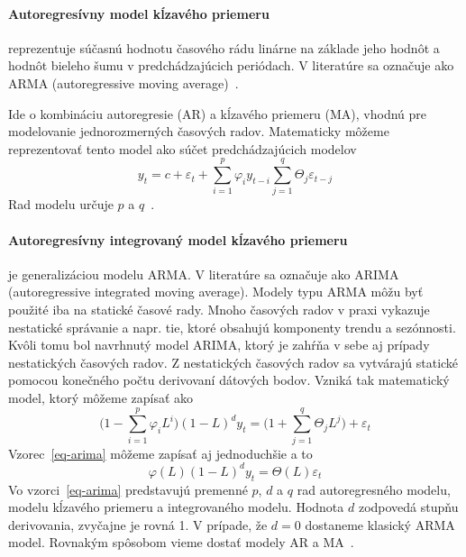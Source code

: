 \documentclass[a4paper,slovak,12pt,appendix]{article}
\begin{document}
\paragraph{Autoregresívny model kĺzavého priemeru} reprezentuje súčasnú hodnotu
časového rádu linárne na základe jeho hodnôt a hodnôt bieleho šumu
v predchádzajúcich periódach. V literatúre sa označuje ako ARMA (autoregressive
moving average)~\cite{KumarSingh2013}.

Ide o kombináciu autoregresie (AR) a kĺzavého priemeru (MA), vhodnú pre
modelovanie jednorozmerných časových radov. Matematicky môžeme reprezentovať
tento model ako súčet predchádzajúcich modelov
\begin{equation}
  y_t = c + \varepsilon_t + \sum_{i=1}^{p} \varphi_i y_{t-i}  \sum_{j=1}^{q} \Theta_j \varepsilon_{t-j}
  \label{eq-arma}
\end{equation}
Rad modelu určuje $p$ a $q$~\cite{Agrawal2013}.

\paragraph{Autoregresívny integrovaný model kĺzavého priemeru} je
generalizáciou modelu ARMA. V literatúre sa označuje ako ARIMA (autoregressive
integrated moving average). Modely typu ARMA môžu byť použité iba na statické
časové rady. Mnoho časových radov v praxi vykazuje nestatické správanie a napr.
tie, ktoré obsahujú komponenty trendu a sezónnosti. Kvôli tomu bol navrhnutý
model ARIMA, ktorý je zahŕňa v sebe aj prípady nestatických časových radov.
Z nestatických časových radov sa vytvárajú statické pomocou konečného počtu
derivovaní dátových bodov. Vzniká tak matematický model, ktorý môžeme zapísať
ako
\begin{equation}
  \Big( 1 - \sum_{i=1}^{p} \varphi_i L^i \Big) (1-L)^d y_t = \Big( 1 + \sum_{j=1}^{q} \Theta_j L^j \Big) + \varepsilon_t
  \label{eq-arima}
\end{equation}
Vzorec~\ref{eq-arima} môžeme zapísať aj jednoduchšie a to
\begin{equation}
  \varphi(L) (1-L)^d y_t = \Theta(L) \varepsilon_t
  \label{eq-arima-short}
\end{equation}
Vo vzorci~\ref{eq-arima} predstavujú premenné $p$, $d$ a $q$ rad autoregresného
modelu, modelu kĺzavého priemeru a integrovaného modelu. Hodnota $d$ zodpovedá
stupňu derivovania, zvyčajne je rovná 1. V prípade, že $d=0$ dostaneme klasický
ARMA model. Rovnakým spôsobom vieme dostať modely AR a MA~\cite{Agrawal2013}.
\end{document}
